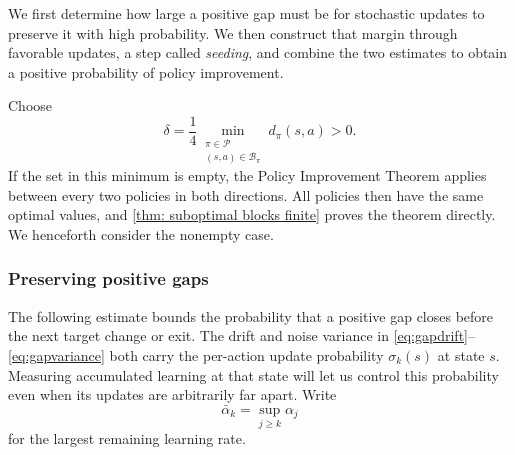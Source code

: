\documentclass[twoside,11pt]{article}
\DeclareRobustCommand{\reviewbarstart}{%
  \ifhmode %
    \vadjust{\vbox to 0pt{%
      \vskip-\ht\strutbox %
      \vskip-\dp\strutbox %
      \cbstart[\changebarwidth] %
      \vss %
    }}%
  \else %
    \cbstart[\changebarwidth]%
  \fi %
} %
\providecommand{\DIFadd}[1]{#1} %
\providecommand{\DIFaddbegin}{\reviewbarstart} %
\providecommand{\DIFaddend}{\protect\cbend} %
\def\DIFadd#1{#1}%
\def\DIFaddbegin{}%
\def\DIFaddend{}%
\begin{document}
 \DIFaddbegin \DIFadd{We first determine how large a positive gap must be for stochastic updates to preserve it with high probability. We then construct that margin through favorable updates, a step called \emph{seeding}, and combine the two estimates to obtain a positive probability of policy improvement}\DIFaddend .

 \DIFaddbegin \DIFadd{Choose
}\begin{equation}
\DIFadd{\label{eq:constants}
\delta=\frac{1}{4}\min_{\substack{\pi\in\mathcal P\\(s,a)\in\mathcal B_\pi}}d_\pi(s,a)>0.
}\end{equation}\DIFaddend 
 \DIFaddbegin \DIFadd{If the set in this minimum is empty, }\DIFaddend the  \DIFaddbegin \DIFadd{Policy Improvement Theorem applies between every two policies in both directions. All policies then have the same optimal values, }\DIFaddend and  \DIFaddbegin \DIFadd{\autoref{thm: suboptimal blocks finite} proves the theorem directly. We henceforth consider the nonempty case.
}\DIFaddend 

 \DIFaddbegin \subsubsection{\DIFadd{Preserving positive gaps}}
\DIFadd{The following estimate bounds the probability that a positive gap closes before the next target change or exit. The drift and noise variance in \eqref{eq:gapdrift}--\eqref{eq:gapvariance} both carry the per-action update probability $\sigma_k(s)$ at state $s$. Measuring accumulated learning at that state will let us control this probability even when its updates are arbitrarily far apart. Write
}\[
\DIFadd{\bar\alpha_k=\sup_{j\ge k}\alpha_j
}\]\DIFaddend 
 \DIFaddbegin \DIFadd{for the largest remaining learning rate.
}\DIFaddend 
\end{document}
